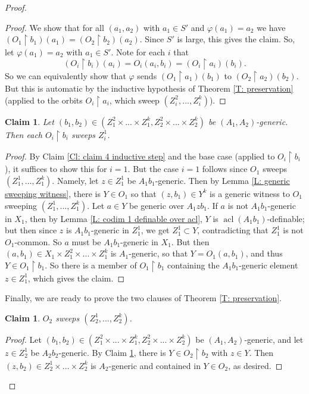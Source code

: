 \documentclass{amsart}
\newtheorem{claim}[theorem]{Claim}
\theoremstyle{definition}
\newcommand{\acl}{\operatorname{acl}}
\begin{document}
\begin{proof}
\begin{proof}
        We show that for all $(a_1,a_2)$ with $a_1\in S'$ and $\varphi(a_1)=a_2$ we have $(O_1\restriction b_1)(a_1)=(O_2\restriction b_2)(a_2)$. Since $S'$ is large, this gives the claim. So, let $\varphi(a_1)=a_2$ with $a_1\in S'$. Note for each $i$ that $$(O_i\restriction b_i)(a_i)=O_i(a_i,b_i)=(O_i\restriction a_i)(b_i).$$ So we can equivalently show that $\varphi$ sends $(O_1\restriction a_1)(b_1)$ to $(O_2\restriction a_2)(b_2)$. But this is automatic by the inductive hypothesis of Theorem \ref{T: preservation} (applied to the orbits $O_i\restriction a_i$, which sweep $(Z_i^2,...,Z_i^k)$).
    \end{proof}

    \begin{claim}\label{Cl: claim 5 inductive step}
    Let $(b_1,b_2)\in(Z_1^2\times...\times Z_1^k,Z_2^2\times...\times Z_2^k)$ be $(A_1,A_2)$-generic. Then each $O_i\restriction b_i$ sweeps $Z_i^1$.
    \end{claim}
    \begin{proof}
        By Claim \ref{Cl: claim 4 inductive step} and the base case (applied to $O_i\restriction b_i$), it suffices to show this for $i=1$. But the case $i=1$ follows since $O_1$ sweeps $(Z_1^1,...,Z_1^k)$. Namely, let $z\in Z_1^1$ be $A_1b_1$-generic. Then by Lemma \ref{L: generic sweeping witness}, there is $Y\in O_1$ so that $(z,b_1)\in Y^k$ is a generic witness to $O_1$ sweeping $(Z_1^1,...,Z_1^k)$. Let $a\in Y$ be generic over $A_1zb_1$. If $a$ is not $A_1b_1$-generic in $X_1$, then by Lemma \ref{L: codim 1 definable over acl}, $Y$ is $\acl(A_1b_1)$-definable; but then since $z$ is $A_1b_1$-generic in $Z_1^1$, we get $Z_1^1\subset Y$, contradicting that $Z_1^1$ is not $O_1$-common. So $a$ must be $A_1b_1$-generic in $X_1$. But then $(a,b_1)\in X_1\times Z_1^2\times...\times Z_1^k$ is $A_1$-generic, so that $Y=O_1(a,b_1)$, and thus $Y\in O_1\restriction b_1$. So there is a member of $O_1\restriction b_1$ containing the $A_1b_1$-generic element $z\in Z_1^1$, which gives the claim. 
    \end{proof} 

    Finally, we are ready to prove the two clauses of Theorem \ref{T: preservation}.

    \begin{claim}
        $O_2$ sweeps $(Z_2^1,...,Z_2^k)$.
    \end{claim}
    \begin{proof}
       Let $(b_1,b_2)\in(Z_1^2\times...\times Z_1^k,Z_2^2\times...\times Z_2^k)$ be $(A_1,A_2)$-generic, and let $z\in Z_2^1$ be $A_2b_2$-generic. By Claim \ref{Cl: claim 5 inductive step}, there is $Y\in O_2\restriction b_2$ with $z\in Y$. Then $(z,b_2)\in Z_2^1\times...\times Z_2^k$ is $A_2$-generic and contained in $Y\in O_2$, as desired.
    \end{proof}


\end{proof}
\end{document}
